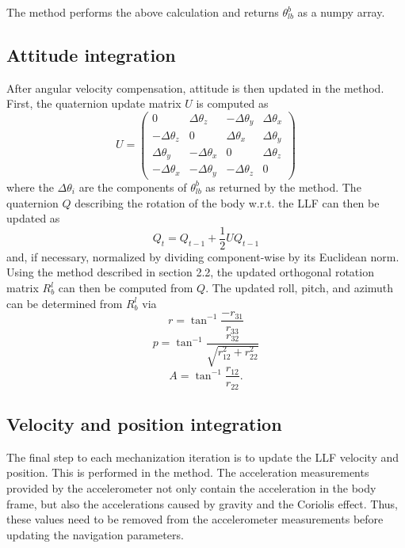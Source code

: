 \documentclass[11pt, oneside]{article}   	%
\begin{document}
The  method performs the above calculation and returns $\theta_{lb}^b$ as a numpy array.

\subsection{Attitude integration}
After angular velocity compensation, attitude is then updated in the  method. First, the quaternion update matrix $U$ is computed as
$$U=\begin{pmatrix}
0 & \Delta\theta_z & -\Delta\theta_y & \Delta\theta_x \\
-\Delta\theta_z & 0 & \Delta\theta_x & \Delta\theta_y \\
\Delta\theta_y & -\Delta\theta_x & 0 & \Delta\theta_z \\
-\Delta\theta_x & -\Delta\theta_y & -\Delta\theta_z & 0 
\end{pmatrix}$$
where the $\Delta\theta_i$ are the components of $\theta_{lb}^b$ as returned by the  method.  The quaternion $Q$ describing the rotation of the body w.r.t. the LLF can then be updated as
$$Q_t=Q_{t-1}+\frac12UQ_{t-1}$$
and, if necessary, normalized by dividing component-wise by its Euclidean norm. Using the method described in section 2.2, the updated orthogonal rotation matrix $R_b^l$ can then be computed from $Q$.
The updated roll, pitch, and azimuth can be determined from $R_b^l$ via 
$$r=\tan^{-1}\frac{-r_{31}}{r_{33}}$$
$$p=\tan^{-1}\frac{r_{32}}{\sqrt{r_{12}^2+r_{22}^2}}$$
$$A=\tan^{-1}\frac{r_{12}}{r_{22}}.$$

\subsection{Velocity and position integration}
The final step to each mechanization iteration is to update the LLF velocity and position.  This is performed in the  method.  
The acceleration measurements provided by the accelerometer not only contain the acceleration in the body frame, but also the accelerations caused by gravity and the Coriolis effect. Thus, these values need to be removed from the accelerometer measurements before updating the navigation parameters.
\end{document}
